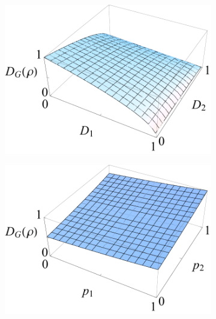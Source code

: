 \documentclass[%
 reprint,
 amsmath,amssymb,
 aps,
]{revtex4-1}
\begin{document}
\begin{figure}
        \centering
        \begin{subfigure}[b]{0.23\textwidth}
                \includegraphics[width=\textwidth]{sq2DG}
                \caption{}
                \label{fig:A1G}
        \end{subfigure}
        \begin{subfigure}[b]{0.23\textwidth}
                \includegraphics[width=\textwidth]{sq2WG}
                \caption{}
                \label{fig:A2G}
        \end{subfigure}
        \vfill
        \begin{subfigure}[b]{0.23\textwidth}

\end{subfigure}
\end{figure}
\end{document}
